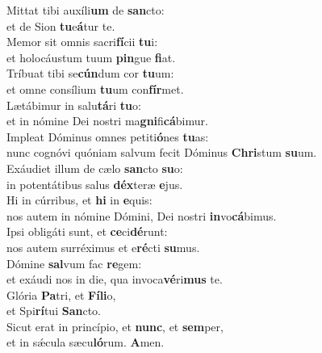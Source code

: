 \evenverse Mittat tibi auxíli\textbf{um} de \textbf{san}cto:~\*\\
\evenverse et de Sion \textbf{tu}e\textbf{á}tur te.\\
\oddverse Memor sit omnis sacri\textbf{fí}cii \textbf{tu}i:~\*\\
\oddverse et holocáustum tuum \textbf{pin}gue \textbf{fi}at.\\
\evenverse Tríbuat tibi se\textbf{cún}dum cor \textbf{tu}um:~\*\\
\evenverse et omne consílium \textbf{tu}um con\textbf{fír}met.\\
\oddverse Lætábimur in salu\textbf{tá}ri \textbf{tu}o:~\*\\
\oddverse et in nómine Dei nostri ma\textbf{gni}fi\textbf{cá}bimur.\\
\evenverse Impleat Dóminus omnes petiti\textbf{ó}nes \textbf{tu}as:~\*\\
\evenverse nunc cognóvi quóniam salvum fecit Dóminus \textbf{Chri}stum \textbf{su}um.\\
\oddverse Exáudiet illum de cælo \textbf{san}cto \textbf{su}o:~\*\\
\oddverse in potentátibus salus \textbf{déx}teræ \textbf{e}jus.\\
\evenverse Hi in cúrribus, et \textbf{hi} in \textbf{e}quis:~\*\\
\evenverse nos autem in nómine Dómini, Dei nostri \textbf{in}vo\textbf{cá}bimus.\\
\oddverse Ipsi obligáti sunt, et \textbf{ce}ci\textbf{dé}runt:~\*\\
\oddverse nos autem surréximus et e\textbf{ré}cti \textbf{su}mus.\\
\evenverse Dómine \textbf{sal}vum fac \textbf{re}gem:~\*\\
\evenverse et exáudi nos in die, qua invoca\textbf{vé}ri\textbf{mus} te.\\
\oddverse Glória \textbf{Pa}tri, et \textbf{Fí}\textbf{li}o,~\*\\
\oddverse et Spi\textbf{rí}tui \textbf{San}cto.\\
\evenverse Sicut erat in princípio, et \textbf{nunc}, et \textbf{sem}per,~\*\\
\evenverse et in sǽcula sæcu\textbf{ló}rum. \textbf{A}men.\\
